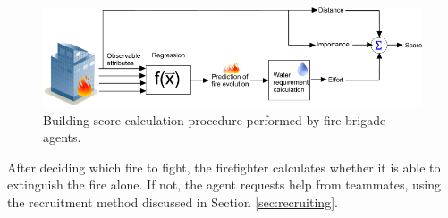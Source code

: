 \begin{figure}[!ht]
     \centering
     \includegraphics[width=12cm]{img/firebrigade.png}
     \caption{Building score calculation procedure performed by fire brigade agents.}
     \label{fig:firebrigade}
\end{figure}


After deciding which fire to fight, the firefighter calculates whether it is able to extinguish the fire alone. If not, the agent requests help from teammates, using the recruitment method discussed in Section \ref{sec:recruiting}.
